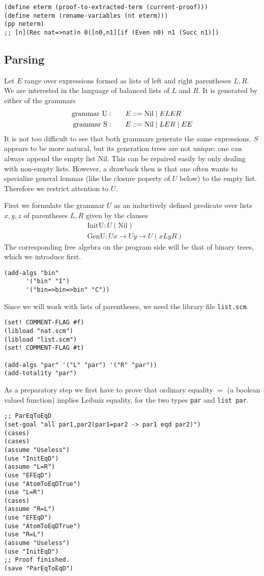 \documentclass[12pt]{amsart}
\newcommand{\nil}{\mathrm{Nil}}
\newcommand{\BNFdef}{\mathtt{\; ::= \;}}
\newcommand{\BNFor}{\mid}
\begin{document}
\begin{appendix}
\begin{verbatim}
(define eterm (proof-to-extracted-term (current-proof)))
(define neterm (rename-variables (nt eterm)))
(pp neterm)
;; [n](Rec nat=>nat)n 0([n0,n1][if (Even n0) n1 (Succ n1)])
\end{verbatim}

\subsection{Parsing}
\label{SS:Parsing}
Let $E$ range over expressions formed as lists of left and right
parentheses $L,R$.  We are interested in the \cite{Dyck82}
language of balanced lists of $L$ and $R$.  It is generated by either
of the grammars
\begin{align*}
  \hbox{grammar U}: &\qquad E \BNFdef \nil \BNFor ELER
  \\
  \hbox{grammar S}: &\qquad E \BNFdef \nil \BNFor LER \BNFor EE
\end{align*}
It is not too difficult to see that both grammars generate the same
expressions.  $S$ appears to be more natural, but its generation trees
are not unique: one can always append the empty list $\nil$.  This can
be repaired easily by only dealing with non-empty lists.  However, a
drawback then is that one often wants to specialize general lemmas
(like the closure poperty of $U$ below) to the empty list.  Therefore
we restrict attention to $U$.

First we formulate the grammar $U$ as an inductively defined predicate
over lists $x,y,z$ of parentheses $L,R$ given by the clauses
\begin{align*}
  & \mathrm{InitU} \colon U (\nil)
  \\
  & \mathrm{GenU} \colon U x \to U y \to U(xLyR)
\end{align*}
The corresponding free algebra on the program side will be that
of binary trees, which we introduce first.
\begin{verbatim}
(add-algs "bin"
	  '("bin" "I")
	  '("bin=>bin=>bin" "C"))
\end{verbatim}
Since we will work with lists of parentheses, we need the library file
\verb|list.scm|.
\begin{verbatim}
(set! COMMENT-FLAG #f)
(libload "nat.scm")
(libload "list.scm")
(set! COMMENT-FLAG #t)

(add-algs "par" '("L" "par") '("R" "par"))
(add-totality "par")
\end{verbatim}
As a preparatory step we first have to prove that ordinary equality $=$
(a boolean valued function) implies Leibniz equality, for the two types
\texttt{par} and \texttt{list\ par}.
\begin{verbatim}
;; ParEqToEqD
(set-goal "all par1,par2(par1=par2 -> par1 eqd par2)")
(cases)
(cases)
(assume "Useless")
(use "InitEqD")
(assume "L=R")
(use "EFEqD")
(use "AtomToEqDTrue")
(use "L=R")
(cases)
(assume "R=L")
(use "EFEqD")
(use "AtomToEqDTrue")
(use "R=L")
(assume "Useless")
(use "InitEqD")
;; Proof finished.
(save "ParEqToEqD")


\end{verbatim}
\end{appendix}
\end{document}
